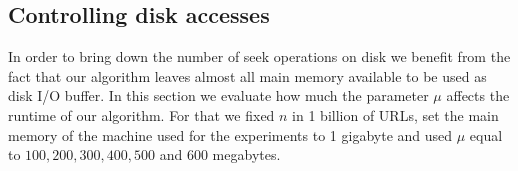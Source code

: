 \vspace{-2mm}
\subsection{Controlling disk accesses}
\label{sec:contr-disk-access}

In order to bring down the number of seek operations on disk
we benefit from the fact that our algorithm leaves almost all main
memory available to be used as disk I/O buffer. 
In this section we evaluate how much the parameter $\mu$ 
affects the runtime of our algorithm.
For that we fixed $n$ in 1 billion of URLs,
set the main memory of the machine used for the experiments 
to 1 gigabyte and used $\mu$ equal to $100, 200, 300, 400, 500$ and $600$
megabytes. 

